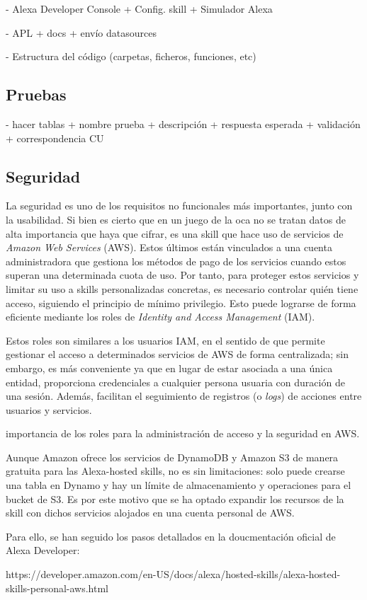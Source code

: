 - Alexa Developer Console
+ Config. skill
+ Simulador Alexa

- APL
+ docs
+ envío datasources

- Estructura del código (carpetas, ficheros, funciones, etc)

\subsection{Pruebas}
- hacer tablas
+ nombre prueba
+ descripción
+ respuesta esperada
+ validación
+ correspondencia CU

\subsection{Seguridad}

La seguridad es uno de los requisitos no funcionales más importantes, junto con la usabilidad. Si bien es cierto que en un juego de la oca no se tratan datos de alta importancia que haya que cifrar, es una skill que hace uso de servicios de \textit{Amazon Web Services} (AWS). Estos últimos están vinculados a una cuenta administradora que gestiona los métodos de pago de los servicios cuando estos superan una determinada cuota de uso. Por tanto, para proteger estos servicios y limitar su uso a skills personalizadas concretas, es necesario controlar quién tiene acceso, siguiendo el principio de mínimo privilegio. Esto puede lograrse de forma eficiente mediante los roles de \textit{Identity and Access Management} (IAM).

Estos roles son similares a los usuarios IAM, en el sentido de que permite gestionar el acceso a determinados servicios de AWS de forma centralizada; sin embargo, es más conveniente ya que en lugar de estar asociada a una única entidad, proporciona credenciales a cualquier persona usuaria con duración de una sesión. Además, facilitan el seguimiento de registros (o \textit{logs}) de acciones entre usuarios y servicios.

importancia de los roles para la administración de acceso y la seguridad en AWS.

Aunque Amazon ofrece los servicios de DynamoDB y Amazon S3 de manera gratuita para las Alexa-hosted skills, no es sin limitaciones: solo puede crearse una tabla en Dynamo y hay un límite de almacenamiento y operaciones para el bucket de S3. Es por este motivo que se ha optado expandir los recursos de la skill con dichos servicios alojados en una cuenta personal de AWS. 

Para ello, se han seguido los pasos detallados en la doucmentación oficial de Alexa Developer:

https://developer.amazon.com/en-US/docs/alexa/hosted-skills/alexa-hosted-skills-personal-aws.html
